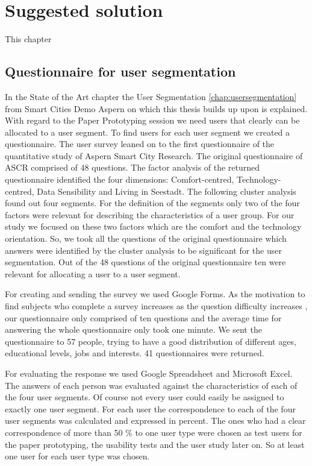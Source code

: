 \chapter{Suggested solution}
This chapter 


\section{Questionnaire for user segmentation}

In the State of the Art chapter the User Segmentation \ref{chap:usersegmentation} from Smart Cities Demo Aspern on which this thesis builds up upon is explained. With regard to the Paper Prototyping session we need users that clearly can be allocated to a user segment. To find users for each user segment we created a questionnaire. The user survey leaned on to the first questionnaire of the quantitative study of Aspern Smart City Research. The original questionnaire of ASCR comprised of 48 questions. The factor analysis of the returned questionnaire identified the four dimensions: Comfort-centred, Technology-centred, Data Sensibility and Living in Seestadt. The following cluster analysis found out four segments. For the definition of the segments only two of the four factors were relevant for describing the characteristics of a user group. For our study we focused on these two factors which are the comfort and the technology orientation. So, we took all the questions of the original questionnaire which answers were identified by the cluster analysis to be significant for the user segmentation. Out of the 48 questions of the original questionnaire ten were relevant for allocating a user to a user segment.

For creating and sending the survey we used Google Forms. As the motivation to find subjects who complete a survey increases as the question difficulty increases \cite{andrews2007conducting}, our questionnaire only comprised of ten questions and the average time for answering the whole questionnaire only took one minute. We sent the questionnaire to 57 people, trying to have a good distribution of different ages, educational levels, jobs and interests. 41 questionnaires were returned.

For evaluating the response we used Google Spreadsheet and Microsoft Excel. The answers of each person was evaluated against the characteristics of each of the four user segments. Of course not every user could easily be assigned to exactly one user segment. For each user the correspondence to each of the four user segments was calculated and expressed in percent. The ones who had a clear correspondence of more than 50 \% to one user type were chosen as test users for the paper prototyping, the usability tests and the user study later on. So at least one user for each user type was chosen. 


